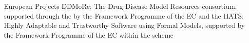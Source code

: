 
\begin{rubric}{European Projects}
		DDMoRe: The Drug Disease Model Resources consortium,
		supported through the  by the
		 Framework Programme of the EC and the %
		\hfill{}
		HATS: Highly Adaptable and Trustworthy Software using Formal Models,
		supported by the  Framework Programme of the EC within the
		 scheme%
		\hfill{}
\end{rubric}

